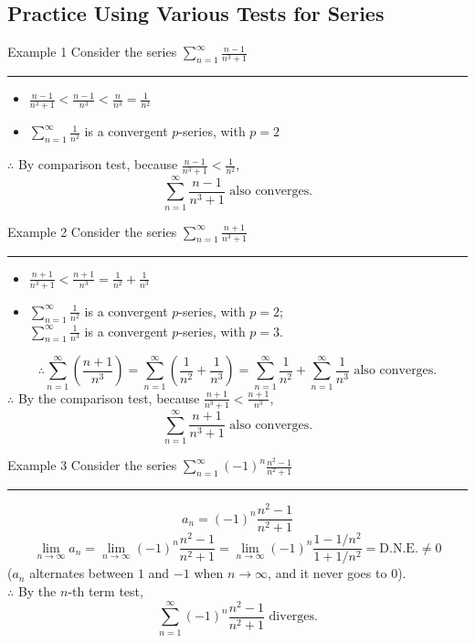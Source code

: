 \documentclass[12pt,a4paper]{article}
\def\DNE{\mathrm{D.N.E.}}
\begin{document}
\subsection{Practice Using Various Tests for Series}
\begin{eg}{Example 1}
	Consider the series $\displaystyle\sum_{n=1}^\infty\frac{n-1}{n^3+1}$\\
	\noindent\rule[0.25\baselineskip]{\textwidth}{1pt}
	\begin{itemize}
		\item $\displaystyle\frac{n-1}{n^3+1}<\frac{n-1}{n^3}<\frac{n}{n^3}=\frac{1}{n^2}$
		\item $\displaystyle\sum_{n=1}^\infty\frac{1}{n^2}$ is a convergent $p$-series, with $p=2$
	\end{itemize}
	$\therefore$ By comparison test, because $\displaystyle\frac{n-1}{n^3+1}<\frac{1}{n^2}$, 
	$$\sum_{n=1}^\infty\frac{n-1}{n^3+1}\text{ also converges.}$$
\end{eg}
\begin{eg}{Example 2}
	Consider the series $\displaystyle\sum_{n=1}^\infty\frac{n+1}{n^3+1}$\\
	\noindent\rule[0.25\baselineskip]{\textwidth}{1pt}
	\begin{itemize}
		\item $\displaystyle\frac{n+1}{n^3+1}<\frac{n+1}{n^3}=\frac{1}{n^2}+\frac{1}{n^3}$
		\item $\displaystyle\sum_{n=1}^\infty\frac{1}{n^2}$ is a convergent $p$-series, with $p=2$;\\
		$\displaystyle\sum_{n=1}^\infty\frac{1}{n^3}$ is a convergent $p$-series, with $p=3$.
	\end{itemize}
	$$\therefore\sum_{n=1}^\infty\left(\frac{n+1}{n^3}\right)=\sum_{n=1}^\infty\left(\frac{1}{n^2}+\frac{1}{n^3}\right)=\sum_{n=1}^\infty\frac{1}{n^2}+\sum_{n=1}^\infty\frac{1}{n^3}\text{ also converges.}$$
	$\therefore$ By the comparison test, because $\displaystyle\frac{n+1}{n^3+1}<\frac{n+1}{n^3}$, 
	$$\sum_{n=1}^\infty\frac{n+1}{n^3+1}\text{ also converges.}$$
\end{eg}
\begin{eg}{Example 3}
	Consider the series $\displaystyle\sum_{n=1}^\infty(-1)^n\frac{n^2-1}{n^2+1}$\\
	\noindent\rule[0.25\baselineskip]{\textwidth}{1pt}
	$$a_n=(-1)^n\frac{n^2-1}{n^2+1}$$
	$$\lim_{n\to\infty}a_n=\lim_{n\to\infty}(-1)^n\frac{n^2-1}{n^2+1}=\lim_{n\to\infty}(-1)^n\frac{1-1/n^2}{1+1/n^2}=\DNE\neq0$$
	($a_n$ alternates between $1$ and $-1$ when $n\to\infty$, and it never goes to $0$).\\
	$\therefore$ By the $n$-th term test, 
	$$\sum_{n=1}^\infty(-1)^n\frac{n^2-1}{n^2+1}\text{ diverges.}$$
\end{eg}
\end{document}

